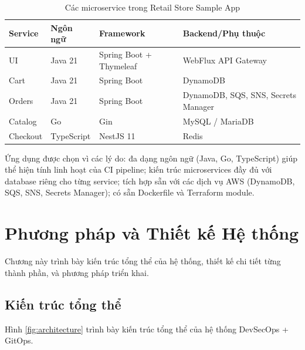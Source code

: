 \documentclass[13pt,a4paper,twoside]{extarticle}
\begin{document}
\begin{table}[H]
\centering
\begin{tabular}{@{}p{2cm} p{2.5cm} p{4cm} p{5.5cm}@{}}
\toprule
\textbf{Service} & \textbf{Ngôn ngữ} & \textbf{Framework} & \textbf{Backend/Phụ thuộc} \\
\midrule
UI & Java 21 & Spring Boot + Thymeleaf & WebFlux API Gateway \\
Cart & Java 21 & Spring Boot & DynamoDB \\
Orders & Java 21 & Spring Boot & DynamoDB, SQS, SNS, Secrets Manager \\
Catalog & Go & Gin & MySQL / MariaDB \\
Checkout & TypeScript & NestJS 11 & Redis \\
\bottomrule
\end{tabular}
\caption{Các microservice trong Retail Store Sample App}
\label{tab:services}
\end{table}

Ứng dụng được chọn vì các lý do: đa dạng ngôn ngữ (Java, Go, TypeScript) giúp thể hiện tính linh hoạt của CI pipeline; kiến trúc microservices đầy đủ với database riêng cho từng service; tích hợp sẵn với các dịch vụ AWS (DynamoDB, SQS, SNS, Secrets Manager); có sẵn Dockerfile và Terraform module.

\newpage

\section{Phương pháp và Thiết kế Hệ thống}

Chương này trình bày kiến trúc tổng thể của hệ thống, thiết kế chi tiết từng thành phần, và phương pháp triển khai.

\subsection{Kiến trúc tổng thể}

Hình \ref{fig:architecture} trình bày kiến trúc tổng thể của hệ thống DevSecOps + GitOps.
\end{document}
